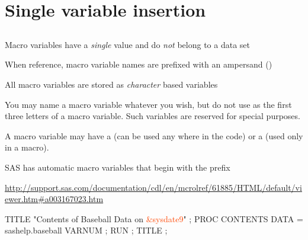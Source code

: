 \section[Single variable insertion]{Single variable insertion}
\subsection{}
\begin{frame}
\end{frame}

\begin{frame}
\bi
\item Macro variables have a \emph{single} value and do \emph{not} belong to a data set
\item When reference, macro variable names are prefixed with an ampersand (\ttt{\&})
\item All macro variables are stored as \emph{character} based variables
\item You may name a macro variable whatever you wish, but do not use  as the first three letters of a macro variable. Such variables are reserved for special purposes.
\item A macro variable may have a  (can be used any where in the code) or a  (used only in a macro).
\ei
\end{frame}

\begin{frame}[fragile]
\bi
\item SAS has automatic macro variables that begin with the prefix 
\item \url{http://support.sas.com/documentation/cdl/en/mcrolref/61885/HTML/default/viewer.htm#a003167023.htm}
\ei
{}
\footnotesize
\begin{code}{.0}
TITLE "Contents of Baseball Data on  \textcolor{OrangeRed}{&sysdate9}" ;
PROC CONTENTS DATA = sashelp.baseball VARNUM ;
RUN ;
TITLE ;
\end{code}
\emp
\end{frame}



